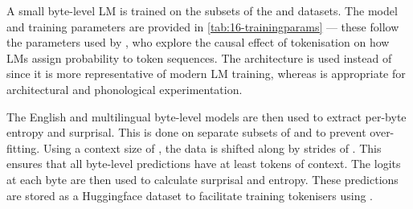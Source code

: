 
A small byte-level LM is trained on the subsets of the \fineweb and \commoncorpus datasets. The model and training parameters are provided in \cref{tab:16-trainingparams} --- these follow the parameters used by \citet{lesci2025causal}, who explore the causal effect of tokenisation on how LMs assign probability to token sequences. The \llama architecture is used instead of \gpt since it is more representative of modern LM training, whereas \gpt is appropriate for architectural and phonological experimentation.


The English and multilingual byte-level models are then used to extract per-byte entropy and surprisal. This is done on separate subsets of \fineweb and \commoncorpus to prevent over-fitting. Using a context size of , the data is shifted along by strides of . This ensures that all byte-level predictions have at least  tokens of context. The logits at each byte are then used to calculate surprisal and entropy. These predictions are stored as a Huggingface dataset to facilitate training tokenisers using \bytespan.

